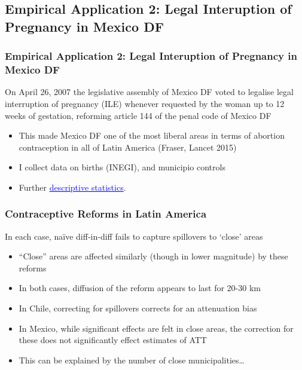 \documentclass[10pt,letterpaper,subeqn]{beamer}
\begin{document}
\subsection{Empirical Application 2: Legal Interuption of Pregnancy in Mexico DF}
\begin{frame}[label=empirB]
  \frametitle{Empirical Application 2: Legal Interuption of Pregnancy in Mexico DF}
On April 26, 2007 the legislative assembly of Mexico DF voted to legalise legal 
interruption of pregnancy (ILE) whenever requested by the woman up to 12 weeks of 
gestation, reforming article 144 of the penal code of Mexico DF
\vspace{5mm}
\begin{itemize}
\item This made Mexico DF one of the most liberal areas in terms of abortion
contraception in all of Latin America (Fraser, Lancet 2015)
\item I collect data on births (INEGI), and municipio controls
\item Further \hyperlink{MexicoDesc}{\textcolor{blue}{descriptive statistics}}.
\end{itemize}

\end{frame}

\begin{frame}[label=empirB2]

\end{frame}

\begin{frame}[label=empirB3]
 \frametitle{Contraceptive Reforms in Latin America}
In each case, na\"ive diff-in-diff fails to capture spillovers to `close' areas
\vspace{8mm}
\begin{itemize}
\item ``Close'' areas are affected similarly (though in lower magnitude) by these reforms
\item In both cases, diffusion of the reform appears to last for 20-30 km
\item In Chile, correcting for spillovers corrects for an attenuation bias
\item In Mexico, while significant effects are felt in close areas, the correction for
these does not significantly effect estimates of ATT
\item This can be explained by the number of close municipalities\ldots
\end{itemize}
\end{frame}
\end{document}
